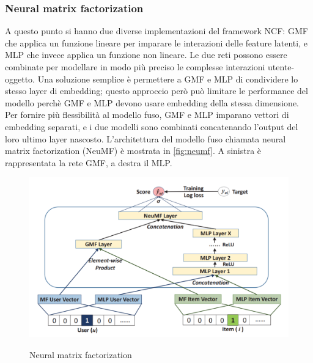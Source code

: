 \subsubsection{Neural matrix factorization} \label{sssec:neumf}
A questo punto si hanno due diverse implementazioni del framework NCF: GMF che applica un funzione lineare per imparare le interazioni delle feature latenti, e MLP che invece applica un funzione non lineare. Le due reti possono essere combinate per modellare in modo più preciso le complesse interazioni utente-oggetto. Una soluzione semplice è permettere a GMF e MLP di condividere lo stesso layer di embedding; questo approccio però può limitare le performance del modello perchè GMF e MLP devono usare embedding della stessa dimensione. Per fornire più flessibilità al modello fuso, GMF e MLP imparano vettori di embedding separati, e i due modelli sono combinati concatenando l'output del loro ultimo layer nascosto. L'architettura del modello fuso chiamata neural matrix factorization (NeuMF) è mostrata in \autoref{fig:neumf}. A sinistra è rappresentata la rete GMF, a destra il MLP.

\begin{figure}
  \centering
  \includegraphics[width=\linewidth]{immagini/neumf.png}
  \caption{Neural matrix factorization}
  \cite{NCF}
  \label{fig:neumf}
\end{figure}


